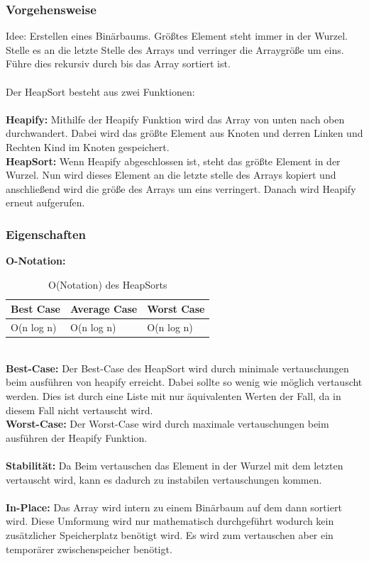 \documentclass{article}
\begin{document}
\subsubsection*{Vorgehensweise}
Idee: Erstellen eines Binärbaums. Größtes Element steht immer in der Wurzel. Stelle es an die letzte Stelle des Arrays und verringer die Arraygröße um eins. Führe dies rekursiv durch bis das Array sortiert ist.\\
\\
Der HeapSort besteht aus zwei Funktionen:\\\\
\textbf{Heapify:} Mithilfe der Heapify Funktion wird das Array von unten nach oben durchwandert. Dabei wird das größte Element aus Knoten und derren Linken und Rechten Kind im Knoten gespeichert. \\
\textbf{HeapSort:} Wenn Heapify abgeschlossen ist, steht das größte Element in der Wurzel. Nun wird dieses Element an die letzte stelle des Arrays kopiert und anschließend wird die größe des Arrays um eins verringert. Danach wird Heapify erneut aufgerufen.\\
\subsubsection*{Eigenschaften}
\textbf{O-Notation:}
\begin{table}[h]
\centering
\begin{tabular}{lll}
	\hline
	\textbf{Best Case} & \textbf{Average Case} & \textbf{Worst Case} \\
	\hline
	O(n log n) & O(n log n) & O(n log n) \\
	\hline
\end{tabular}
\caption{O(Notation) des HeapSorts \cite{India2015Dataset}}
\label{tab:HeapSort}
\end{table}
\\
\textbf{Best-Case:} Der Best-Case des HeapSort wird durch minimale vertauschungen beim ausführen von heapify erreicht. Dabei sollte so wenig wie möglich vertauscht werden. Dies ist durch eine Liste mit nur äquivalenten Werten der Fall, da in diesem Fall nicht vertauscht wird. \\
\textbf{Worst-Case:} Der Worst-Case wird durch maximale vertauschungen beim ausführen der Heapify Funktion. \\\\
\textbf{Stabilität:} Da Beim vertauschen das Element in der Wurzel mit dem letzten vertauscht wird, kann es dadurch zu instabilen vertauschungen kommen.  \\
\\
\textbf{In-Place:} Das Array wird intern zu einem Binärbaum auf dem dann sortiert wird. Diese Umformung wird nur mathematisch durchgeführt wodurch kein zusätzlicher Speicherplatz benötigt wird. Es wird zum vertauschen aber ein temporärer zwischenspeicher benötigt. \\
\end{document}
